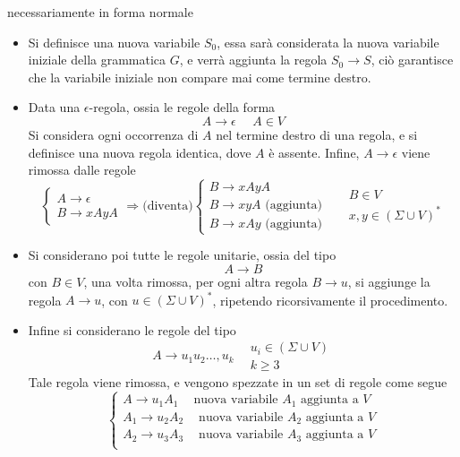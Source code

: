 \documentclass[10pt, letterpaper]{report}
\begin{document}
necessariamente in forma normale\begin{itemize}
    \item Si definisce una nuova variabile $S_0$, essa sarà considerata la nuova variabile iniziale della grammatica 
    $G$, e verrà aggiunta la regola $S_0\rightarrow S$, ciò garantisce che la variabile iniziale non compare mai 
    come termine destro. 
    \item Data una $\epsilon$-regola, ossia le regole della forma 
    $$ A\longrightarrow \epsilon \ \ \ \ \ \ A\in V$$
    Si considera ogni occorrenza di $A$ nel termine destro di una regola, e si definisce una nuova regola 
    identica, dove $A$ è assente. Infine, $A\longrightarrow \epsilon$ viene rimossa dalle regole 
    $$ \begin{cases}
        A\longrightarrow \epsilon \\ 
        B\longrightarrow xAyA
    \end{cases} \Longrightarrow  \text{(diventa)}\begin{cases}
        B\longrightarrow xAyA\\ 
        B\longrightarrow xyA \text{ (aggiunta)}\\ 
        B\longrightarrow xAy \text{ (aggiunta)}
    \end{cases}\ \ \ \ \ \ \begin{matrix}
        B\in V\\ x,y\in (\Sigma\cup V)^*
    \end{matrix}$$
    \item Si considerano poi tutte le regole unitarie, ossia del tipo $$ A\longrightarrow B$$ con $B\in V$, una 
    volta rimossa, per ogni altra regola $B\rightarrow u$, si aggiunge la regola $A\rightarrow u$, con 
    $u\in(\Sigma\cup V)^*$, ripetendo ricorsivamente il procedimento. 
    \item Infine si considerano le regole del tipo 
    $$A\longrightarrow u_1u_2\dots,u_k \ \ \ \ \begin{matrix}u_i\in(\Sigma\cup V)\\k\ge 3 \end{matrix}$$
    Tale regola viene rimossa, e vengono spezzate in un set di regole come segue $$\begin{cases}
        A\longrightarrow u_1A_1 \ \ \ \ \text{ nuova variabile $A_1$ aggiunta a $V$}\\ 
        A_1\longrightarrow u_2A_2 \ \ \ \ \text{ nuova variabile $A_2$ aggiunta a $V$}\\ 
        A_2\longrightarrow u_3A_3 \ \ \ \ \text{ nuova variabile $A_3$ aggiunta a $V$}\\ 

\end{cases}$$
\end{itemize}
\end{document}
